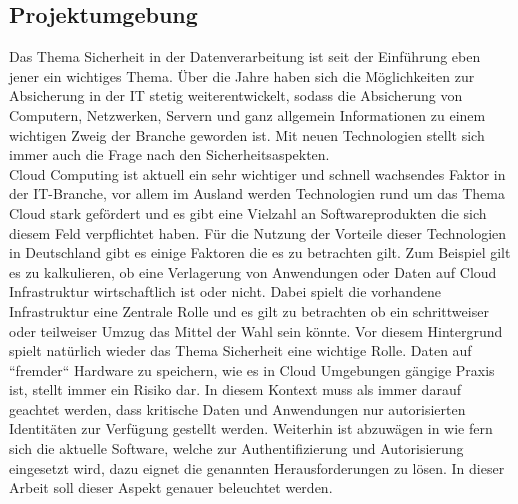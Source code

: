 \documentclass[
book,
a4paper,   
titlepage,  
halfparskip,
12pt        
]{scrartcl}
\begin{document}
\begin{onehalfspacing}
\subsection{Projektumgebung}
\label{subsec:proj}
Das Thema Sicherheit in der Datenverarbeitung ist seit der Einführung eben jener ein wichtiges Thema. Über die Jahre haben sich die Möglichkeiten zur Absicherung in der \ac{IT} stetig weiterentwickelt, sodass die Absicherung von Computern, Netzwerken, Servern und ganz allgemein Informationen zu einem wichtigen Zweig der Branche geworden ist. Mit neuen Technologien stellt sich immer auch die Frage nach den Sicherheitsaspekten.\\
Cloud Computing ist aktuell ein sehr wichtiger und schnell wachsendes Faktor in der \ac{IT}-Branche, vor allem im Ausland werden Technologien rund um das Thema Cloud stark gefördert und es gibt eine Vielzahl an Softwareprodukten die sich diesem Feld verpflichtet haben. Für die Nutzung der Vorteile dieser Technologien in Deutschland gibt es einige Faktoren die es zu betrachten gilt. Zum Beispiel gilt es zu kalkulieren, ob eine Verlagerung von Anwendungen oder Daten auf Cloud Infrastruktur wirtschaftlich ist oder nicht. Dabei spielt die vorhandene Infrastruktur eine Zentrale Rolle und es gilt zu betrachten ob ein schrittweiser oder teilweiser Umzug das Mittel der Wahl sein könnte. Vor diesem Hintergrund spielt natürlich wieder das Thema Sicherheit eine wichtige Rolle. Daten auf ``fremder`` Hardware zu speichern, wie es in Cloud Umgebungen gängige Praxis ist, stellt immer ein Risiko dar. In diesem Kontext muss als immer darauf geachtet werden, dass kritische Daten und Anwendungen nur autorisierten Identitäten zur Verfügung gestellt werden. Weiterhin ist abzuwägen in wie fern sich die aktuelle Software, welche zur Authentifizierung und Autorisierung eingesetzt wird, dazu eignet die genannten Herausforderungen zu lösen. In dieser Arbeit soll dieser Aspekt genauer beleuchtet werden.

\end{onehalfspacing}
\end{document}

